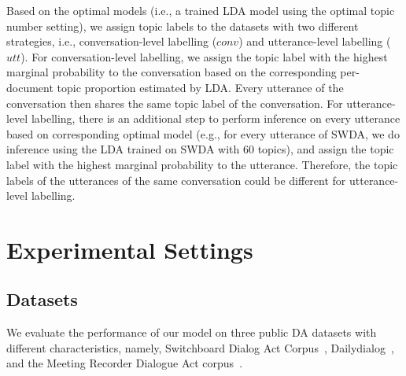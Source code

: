 \documentclass[11pt,a4paper]{article}
\begin{document}
Based on the optimal models (i.e., a trained LDA model using the optimal topic number setting), we assign topic labels to the datasets with two different strategies, i.e., conversation-level labelling ($conv$) and utterance-level labelling ($utt$). For conversation-level labelling, we assign the topic label with the highest marginal probability to the conversation based on the corresponding per-document topic proportion estimated by LDA. Every utterance of the conversation then shares the same topic label of the conversation. For utterance-level labelling, there is an additional step to perform inference on every utterance based on corresponding optimal model (e.g., for every utterance of SWDA, we do inference using the LDA trained on SWDA with 60 topics), and assign the topic label with the highest marginal probability to the utterance. Therefore, the topic labels of the utterances of the same conversation could be different for utterance-level labelling. 





\begin{table}[tb]
  \caption{$|C|$ is the number of DA classes, $|T|$ is the number of 
manually labelled conversation-level topic classes, $|V|$ is the vocabulary size. Training, Validation and Testing indicate the number of conversations/utterances in the respective splits.}
  \label{T:datasets}
\end{table}



\section{Experimental Settings}

\subsection{Datasets}
We evaluate the performance of our model on three public DA datasets with different characteristics, namely, Switchboard Dialog Act Corpus~\cite[SWDA]{jurafsky1997switchboard}, Dailydialog~\cite[DyDA]{li2017dailydialog}, and the Meeting Recorder Dialogue Act corpus~\cite[MRDA]{janin2003icsi}. 
\end{document}
